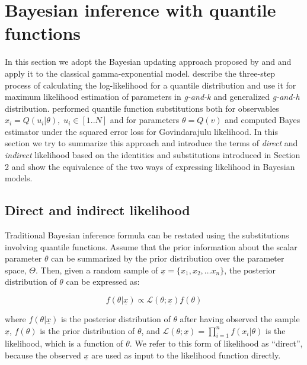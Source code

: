 \documentclass[
  12pt,
]{article}
\begin{document}
\hypertarget{bayesian-inference-with-quantile-functions}{%
\section{Bayesian inference with quantile functions}\label{bayesian-inference-with-quantile-functions}}

In this section we adopt the Bayesian updating approach proposed by \citet{rayner2002NumericalMaximumLikelihood} and \citet{nair2020BayesianInferenceQuantile} and apply it to the classical gamma-exponential model. \citet{rayner2002NumericalMaximumLikelihood} describe the three-step process of calculating the log-likelihood for a quantile distribution and use it for maximum likelihood estimation of parameters in \emph{g-and-k} and generalized \emph{g-and-h} distribution. \citet{nair2020BayesianInferenceQuantile} performed quantile function substitutions both for observables \(x_i=Q(u_i|\theta), \; u_i \in [1..N]\) and for parameters \(\theta=Q(v)\) and computed Bayes estimator under the squared error loss for Govindarajulu likelihood. In this section we try to summarize this approach and introduce the terms of \emph{direct} and \emph{indirect} likelihood based on the identities and substitutions introduced in Section 2 and show the equivalence of the two ways of expressing likelihood in Bayesian models.

\hypertarget{direct-and-indirect-likelihood}{%
\subsection{Direct and indirect likelihood}\label{direct-and-indirect-likelihood}}

Traditional Bayesian inference formula can be restated using the substitutions involving quantile functions. Assume that the prior information about the scalar parameter \(\theta\) can be summarized by the prior distribution over the parameter space, \(\Theta\). Then, given a random sample of \(\underline x=\{x_1, x_2, \dots x_n\}\), the posterior distribution of \(\theta\) can be expressed as:

\[
f(\theta|\underline{x}) \propto \mathcal{L}(\theta;\underline{x})f(\theta)
\label{eq:bayespdfeq}
\]

where \(f(\theta|\underline{x})\) is the posterior distribution of \(\theta\) after having observed the sample \(\underline{x}\), \(f(\theta)\) is the prior distribution of \(\theta\), and \(\mathcal{L}(\theta;\underline x)=\prod_{i=1}^{n}f(x_i|\theta)\) is the likelihood, which is a function of \(\theta\). We refer to this form of likelihood as ``direct'', because the observed \(\underline x\) are used as input to the likelihood function directly.
\end{document}
